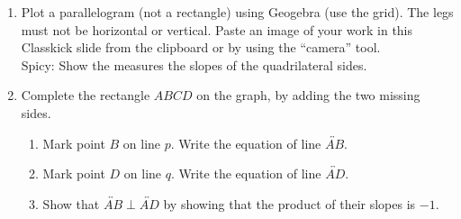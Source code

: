 \documentclass[12pt, twoside]{article}
\begin{document}
\begin{enumerate}
\newpage
\item Plot a parallelogram (not a rectangle) using Geogebra (use the grid). The legs must not be horizontal or vertical. Paste an image of your work in this Classkick slide from the clipboard or by using the ``camera'' tool.\\[0.25cm]
Spicy: Show the measures the slopes of the quadrilateral sides.

  
\newpage
\item Complete the rectangle $ABCD$ on the graph, by adding the two missing sides.
\begin{multicols}{2}
    \begin{enumerate}[itemsep=2cm]
      \item Mark point $B$ on line $p$. Write the equation of line $\overleftrightarrow{AB}$.
      \item Mark point $D$ on line $q$. Write the equation of line $\overleftrightarrow{AD}$.
      \item Show that $\overleftrightarrow{AB} \perp \overleftrightarrow{AD}$ by showing that the product of their slopes is $-1$.
      \end{enumerate}
    \begin{flushright}
    \end{flushright}
\end{multicols}
    
\end{enumerate}
\end{document}
